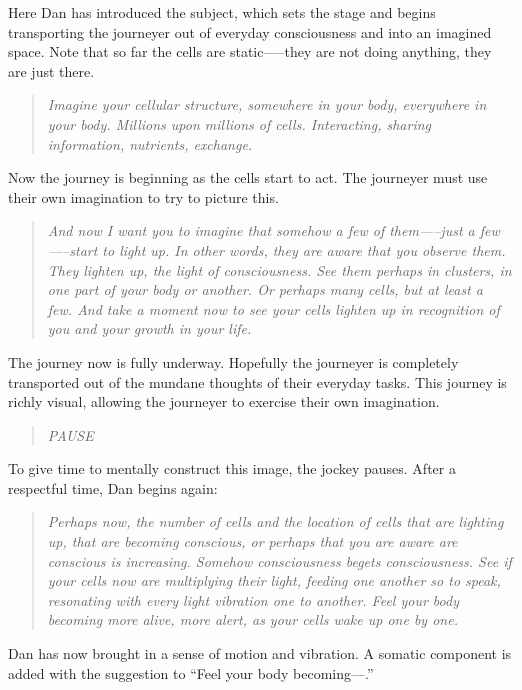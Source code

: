 \documentclass[12pt]{book}
\begin{document}
Here Dan has introduced the subject, which sets the stage and begins transporting the journeyer out of everyday consciousness and into an imagined space. Note that so far the cells are static—--they are not doing anything, they are just there.

\begin{quote}{\em
Imagine your cellular structure, somewhere in your body, everywhere in your body. Millions upon millions of cells. Interacting, sharing information, nutrients, exchange.
}\end{quote}
Now the journey is beginning as the cells start to act. The journeyer must use their own imagination to try to picture this.


\begin{quote}{\em
And now I want you to imagine that somehow a few of them—--just a few—--start to light up. In other words, they are aware that you observe them. They lighten up, the light of consciousness. See them perhaps in clusters, in one part of your body or another. Or perhaps many cells, but at least a few. And take a moment now to see your cells lighten up in recognition of you and your growth in your life.
}\end{quote}

The journey now is fully underway. Hopefully the journeyer is completely transported out of the mundane thoughts of their everyday tasks. This journey is richly visual, allowing the journeyer to exercise their own imagination.

\begin{quote}{\em
  PAUSE
}\end{quote}

To give time to mentally construct this image, the jockey pauses. After a respectful time, Dan begins again:

\begin{quote}{\em
Perhaps now, the number of cells and the location of cells that are lighting up, that are becoming conscious, or perhaps that you are aware are conscious is increasing. Somehow consciousness begets consciousness. See if your cells now are multiplying their light, feeding one another so to speak, resonating with every light vibration one to another. Feel your body becoming more alive, more alert, as your cells wake up one by one.
}\end{quote}


Dan has now brought in a sense of motion and vibration. A somatic
component is added with the suggestion to ``Feel your body becoming---.''
\end{document}

